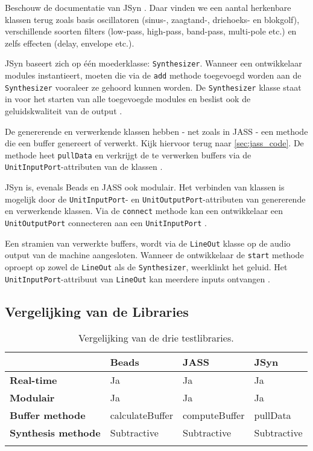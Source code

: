 Beschouw de documentatie van JSyn \autocite{jsyndocs}. Daar vinden we een aantal herkenbare klassen terug zoals basis oscillatoren (sinus-, zaagtand-, driehoeks- en blokgolf), verschillende soorten filters (low-pass, high-pass, band-pass, multi-pole etc.) en zelfs effecten (delay, envelope etc.).

JSyn baseert zich op één moederklasse: \verb+Synthesizer+. Wanneer een ontwikkelaar modules instantieert, moeten die via de \verb+add+ methode toegevoegd worden aan de \verb+Synthesizer+ vooraleer ze gehoord kunnen worden. De \verb+Synthesizer+ klasse staat in voor het starten van alle toegevoegde modules en beslist ook de geluidskwaliteit van de output \autocite{jsyndocs}.

De genererende en verwerkende klassen hebben - net zoals in JASS - een methode die een buffer genereert of verwerkt. Kijk hiervoor terug naar \ref{sec:jass_code}. De methode heet \verb+pullData+ en verkrijgt de te verwerken buffers via de \verb+UnitInputPort+-attributen van de klassen \autocite{jsyndocs}.

JSyn is, evenals Beads en JASS ook modulair. Het verbinden van klassen is mogelijk door de \verb+UnitInputPort+- en \verb+UnitOutputPort+-attributen van genererende en verwerkende klassen. Via de \verb+connect+ methode kan een ontwikkelaar een \verb+UnitOutputPort+ connecteren aan een \verb+UnitInputPort+ \autocite{jsyndocs}.

Een stramien van verwerkte buffers, wordt via de \verb+LineOut+ klasse op de audio output van de machine aangesloten. Wanneer de ontwikkelaar de \verb+start+ methode oproept op zowel de \verb+LineOut+ als de \verb+Synthesizer+, weerklinkt het geluid. Het \verb+UnitInputPort+-attribuut van \verb+LineOut+ kan meerdere inputs ontvangen \autocite{jsyndocs}.

\subsection*{Vergelijking van de Libraries}
\label{subsec:vergelijkinglibraries}

\begin{longtable}[c]{l|lll}
         & \textbf{Beads} & \textbf{JASS} & \textbf{JSyn} \\ \hline
        \textbf{Real-time} & Ja & Ja & Ja \\
        \textbf{Modulair} & Ja & Ja & Ja \\
        \textbf{Buffer methode} & calculateBuffer & computeBuffer & pullData \\
        \textbf{Synthesis methode} & Subtractive & Subtractive & Subtractive \\
    \caption{Vergelijking van de drie testlibraries.}
    \label{tab:vergelijking}
\end{longtable}

